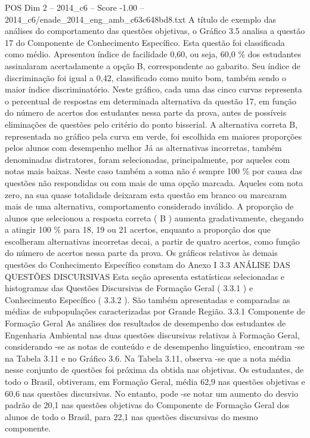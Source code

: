 \begin{textsample}{POS Dim 2 – 2014\_c6 – Score -1.00 – 2014\_c6/enade\_2014\_eng\_amb\_c63c648bd8.txt}
A título de exemplo das análises do comportamento das questões objetivas, o Gráfico 3.5 analisa a questão 17 do Componente de Conhecimento Específico.
Esta questão foi classificada como médio.
Apresentou índice de facilidade 0,60, ou seja, 60,0 \% dos estudantes assinalaram acertadamente a opção B, correspondente ao gabarito.
Seu índice de discriminação foi igual a 0,42, classificado como muito bom, também sendo o maior índice discriminatório.
Neste gráfico, cada uma das cinco curvas representa o percentual de respostas em determinada alternativa da questão 17, em função do número de acertos dos estudantes nessa parte da prova, antes de possíveis eliminações de questões pelo critério do ponto bisserial.
A alternativa correta B, representada no gráfico pela curva em verde, foi escolhida em maiores proporções pelos alunos com desempenho melhor Já as alternativas incorretas, também denominadas distratores, foram selecionadas, principalmente, por aqueles com notas mais baixas.
Neste caso também a soma não é sempre 100 \% por causa das questões não respondidas ou com mais de uma opção marcada.
Aqueles com nota zero, na sua quase totalidade deixaram esta questão em branco ou marcaram mais de uma alternativa, comportamento considerado inválido.
A proporção de alunos que selecionou a resposta correta ( B ) aumenta gradativamente, chegando a atingir 100 \% para 18, 19 ou 21 acertos, enquanto a proporção dos que escolheram alternativas incorretas decai, a partir de quatro acertos, como função do número de acertos nessa parte da prova.
Os gráficos relativos às demais questões do Conhecimento Específico constam do Anexo I 3.3 ANÁLISE DAS QUESTÕES DISCURSIVAS Esta seção apresenta estatísticas selecionadas e histogramas das Questões Discursivas de Formação Geral ( 3.3.1 ) e Conhecimento Específico ( 3.3.2 ).
São também apresentadas e comparadas as médias de subpopulações caracterizadas por Grande Região. 3.3.1 Componente de Formação Geral As análises dos resultados de desempenho dos estudantes de Engenharia Ambiental nas duas questões discursivas relativas à Formação Geral, considerando -se as notas de conteúdo e de desempenho linguístico, encontram -se na Tabela 3.11 e no Gráfico 3.6.
Na Tabela 3.11, observa -se que a nota média nesse conjunto de questões foi próxima da obtida nas objetivas.
Os estudantes, de todo o Brasil, obtiveram, em Formação Geral, média 62,9 nas questões objetivas e 60,6 nas questões discursivas.
No entanto, pode -se notar um aumento do desvio padrão de 20,1 nas questões objetivas do Componente de Formação Geral dos alunos de todo o Brasil, para 22,1 nas questões discursivas do mesmo componente.

\end{textsample}
